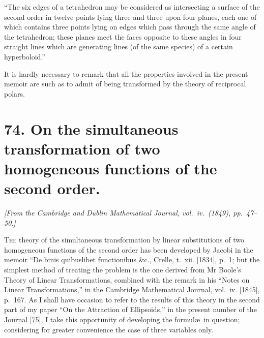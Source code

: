 \documentclass[11pt,a4paper]{book}
\begin{document}
``The six edges of a tetrahedron may be considered as intersecting a surface of the second order in twelve points lying three and three upon four planes, each one of which contains three points lying on edges which pass through the same angle of the tetrahedron; these planes meet the faces opposite to these angles in four straight lines which are generating lines (of the same species) of a certain hyperboloid.''

It is hardly necessary to remark that all the properties involved in the present memoir are such as to admit of being transformed by the theory of reciprocal polars.



\newpage
\section*{74. On the simultaneous transformation of two homogeneous functions of the second order.}

\begin{flushright}
\textit{[From the Cambridge and Dublin Mathematical Journal, vol.\ iv.\ (1849), pp.\ 47--50.]}
\end{flushright}

\setcounter{page}{428}

\textsc{The} theory of the simultaneous transformation by linear substitutions of two homogeneous functions of the second order has been developed by Jacobi in the memoir ``De binis quibuslibet functionibus \&c., Crelle, t.~xii. [1834], p.~1; but the simplest method of treating the problem is the one derived from Mr Boole's Theory of Linear Transformations, combined with the remark in his ``Notes on Linear Transformations,'' in the Cambridge Mathematical Journal, vol.~iv. [1845], p.~167. As I shall have occasion to refer to the results of this theory in the second part of my paper ``On the Attraction of Ellipsoids,'' in the present number of the Journal [75], I take this opportunity of developing the formul\ae\ in question; considering for greater convenience the case of three variables only.
\end{document}
